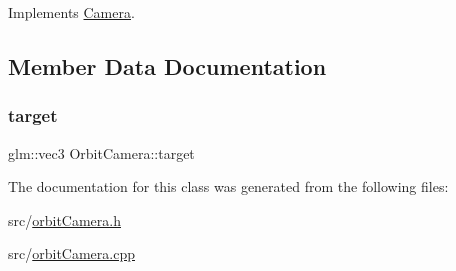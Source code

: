 Implements \hyperlink{classCamera_a279a5a9fdcdb6161bab2c3ff8fce275b}{Camera}.



\subsection{Member Data Documentation}
\mbox{\label{classOrbitCamera_ab6f07eef6c4b0226b7abfc537b698c89}} 
\subsubsection{\texorpdfstring{target}{target}}
{\footnotesize\ttfamily glm\+::vec3 Orbit\+Camera\+::target}



The documentation for this class was generated from the following files\+:\begin{DoxyCompactItemize}
\item 
src/\hyperlink{orbitCamera_8h}{orbit\+Camera.\+h}\item 
src/\hyperlink{orbitCamera_8cpp}{orbit\+Camera.\+cpp}\end{DoxyCompactItemize}
